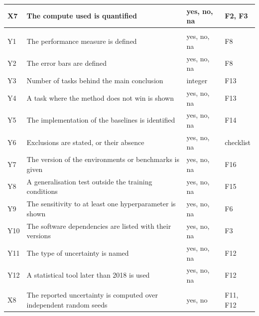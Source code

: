 \begin{small}
\begin{longtable}{@{}>{\raggedright\arraybackslash}p{0.9cm} >{\raggedright\arraybackslash}p{8.0cm} >{\raggedright\arraybackslash}p{2.2cm} >{\raggedright\arraybackslash}p{2.4cm}@{}}
X7 & The compute used is quantified & yes, no, na & F2, F3 \\
\midrule
\multicolumn{4}{@{}l}{\emph{Grid v2}} \\
Y1 & The performance measure is defined & yes, no, na & F8 \\
Y2 & The error bars are defined & yes, no, na & F8 \\
Y3 & Number of tasks behind the main conclusion & integer & F13 \\
Y4 & A task where the method does not win is shown & yes, no, na & F13 \\
Y5 & The implementation of the baselines is identified & yes, no, na & F14 \\
Y6 & Exclusions are stated, or their absence & yes, no, na & checklist \\
Y7 & The version of the environments or benchmarks is given & yes, no, na & F16 \\
Y8 & A generalisation test outside the training conditions & yes, no, na & F15 \\
Y9 & The sensitivity to at least one hyperparameter is shown & yes, no, na & F6 \\
Y10 & The software dependencies are listed with their versions & yes, no, na & F3 \\
Y11 & The type of uncertainty is named & yes, no, na & F12 \\
Y12 & A statistical tool later than 2018 is used & yes, no, na & F12 \\
\midrule
\multicolumn{4}{@{}l}{\emph{Complementary criterion}} \\
X8 & The reported uncertainty is computed over independent random seeds & yes, no & F11, F12 \\
\end{longtable}
\end{small}

